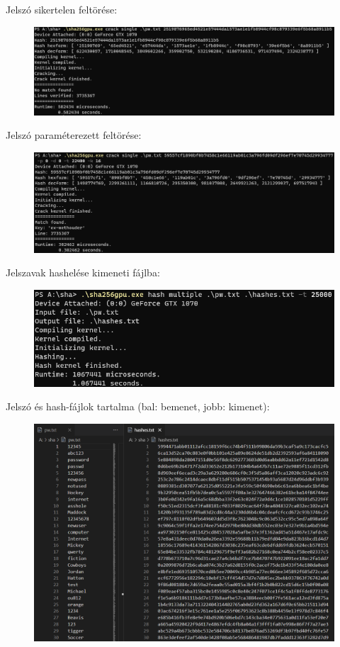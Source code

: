 Jelszó sikertelen feltörése:
%
\begin{figure}[H]
    \centering
    \includegraphics[width=\textwidth]{images/examples/example-crack-unsuccessful.png}
\end{figure}

Jelszó paraméterezett feltörése:
%
\begin{figure}[H]
    \centering
    \includegraphics[width=\textwidth]{images/examples/example-crack-params.png}
\end{figure}

Jelszavak hashelése kimeneti fájlba:
%
\begin{figure}[H]
    \centering
    \includegraphics[width=\textwidth]{images/examples/example-hash-multiple.png}
\end{figure}

Jelszó és hash-fájlok tartalma (bal: bemenet, jobb: kimenet):
%
\begin{figure}[H]
    \centering
    \includegraphics[width=\textwidth]{images/examples/example-hash-files.png}
\end{figure}


